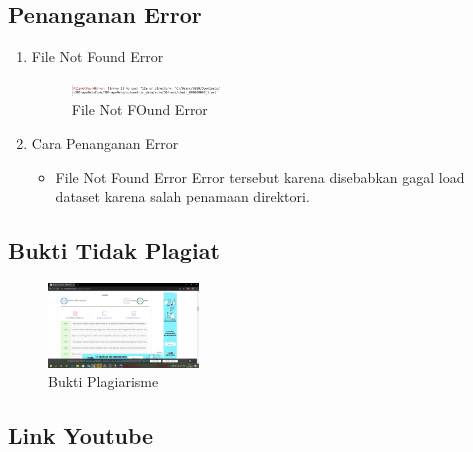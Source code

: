 \subsection{Penanganan Error}
\begin{enumerate}
	\item File Not Found Error
	\begin{figure}[H]
		\includegraphics[width=4cm]{figures/1174054/8/error.png}
		\centering
		\caption{File Not FOund Error}
	\end{figure}

	\item Cara Penanganan Error
	\begin{itemize}
		\item File Not Found Error
		\hfill\break
		Error tersebut karena disebabkan gagal load dataset karena salah penamaan direktori.
	\end{itemize}
\end{enumerate}

\subsection{Bukti Tidak Plagiat}
\begin{figure}[H]
	\includegraphics[width=4cm]{figures/1174054/8/plagiarisme.png}
	\centering
	\caption{Bukti Plagiarisme}
\end{figure}

\subsection{Link Youtube}